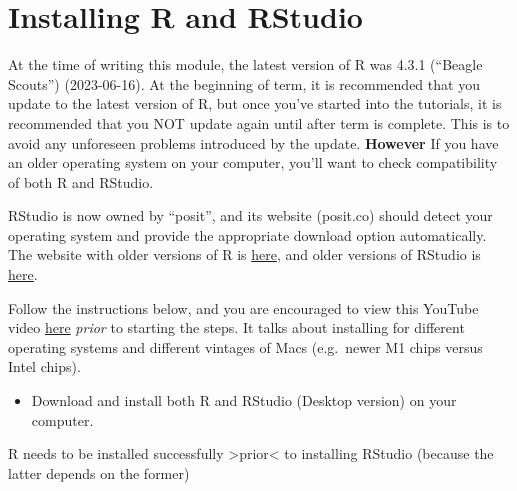 \documentclass[
]{book}
\providecommand{\tightlist}{%
  \setlength{\itemsep}{0pt}\setlength{\parskip}{0pt}}
\begin{document}
\section{Installing R and RStudio}\label{install_R_Rstudio}

At the time of writing this module, the latest version of R was 4.3.1 (``Beagle Scouts'') (2023-06-16). At the beginning of term, it is recommended that you update to the latest version of R, but once you've started into the tutorials, it is recommended that you NOT update again until after term is complete. This is to avoid any unforeseen problems introduced by the update. \textbf{However} If you have an older operating system on your computer, you'll want to check compatibility of both R and RStudio.

RStudio is now owned by ``posit'', and its website (posit.co) should detect your operating system and provide the appropriate download option automatically. The website with older versions of R is \href{https://cran.r-project.org/bin/macosx/}{here}, and older versions of RStudio is \href{https://docs.posit.co/previous-versions/rstudio/}{here}.

Follow the instructions below, and you are encouraged to view this YouTube video \href{https://www.youtube.com/watch?v=tgPuB-iNww0}{here} \emph{prior} to starting the steps. It talks about installing for different operating systems and different vintages of Macs (e.g.~newer M1 chips versus Intel chips).

\begin{itemize}
\tightlist
\item
  Download and install both R and RStudio (Desktop version) on your computer.
\end{itemize}

R needs to be installed successfully \textgreater prior\textless{} to installing RStudio (because the latter depends on the former)
\end{document}
